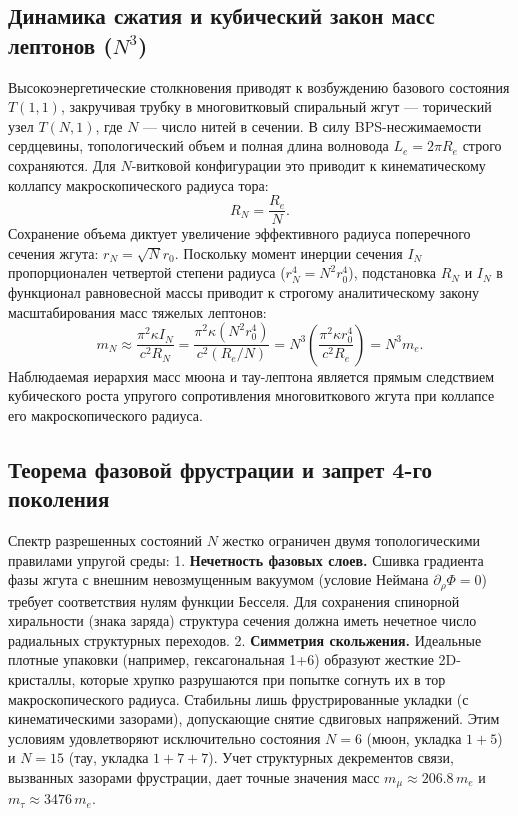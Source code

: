 \documentclass[12pt,a4paper]{article}
\begin{document}
\subsection{Динамика сжатия и кубический закон масс лептонов ($N^3$)}
Высокоэнергетические столкновения приводят к возбуждению базового состояния $T(1,1)$, закручивая трубку в многовитковый спиральный жгут — торический узел $T(N,1)$, где $N$ — число нитей в сечении.
В силу BPS-несжимаемости сердцевины, топологический объем и полная длина волновода $L_e = 2\pi R_e$ строго сохраняются. Для $N$-витковой конфигурации это приводит к кинематическому коллапсу макроскопического радиуса тора:
\begin{equation}
	R_N = \frac{R_e}{N}.
\end{equation}
Сохранение объема диктует увеличение эффективного радиуса поперечного сечения жгута: $r_N = \sqrt{N} r_0$. Поскольку момент инерции сечения $I_N$ пропорционален четвертой степени радиуса ($r_N^4 = N^2 r_0^4$), подстановка $R_N$ и $I_N$ в функционал равновесной массы приводит к строгому аналитическому закону масштабирования масс тяжелых лептонов:
\begin{equation}
	m_N \approx \frac{\pi^2 \kappa I_N}{c^2 R_N} = \frac{\pi^2 \kappa (N^2 r_0^4)}{c^2 (R_e / N)} = N^3 \left( \frac{\pi^2 \kappa r_0^4}{c^2 R_e} \right) = N^3 m_e.
	\label{eq:cubic_mass_law}
\end{equation}
Наблюдаемая иерархия масс мюона и тау-лептона является прямым следствием кубического роста упругого сопротивления многовиткового жгута при коллапсе его макроскопического радиуса.

\subsection{Теорема фазовой фрустрации и запрет 4-го поколения}
Спектр разрешенных состояний $N$ жестко ограничен двумя топологическими правилами упругой среды:
1. \textbf{Нечетность фазовых слоев.} Сшивка градиента фазы жгута с внешним невозмущенным вакуумом (условие Неймана $\partial_\rho \Phi = 0$) требует соответствия нулям функции Бесселя. Для сохранения спинорной хиральности (знака заряда) структура сечения должна иметь нечетное число радиальных структурных переходов.
2. \textbf{Симметрия скольжения.} Идеальные плотные упаковки (например, гексагональная 1+6) образуют жесткие 2D-кристаллы, которые хрупко разрушаются при попытке согнуть их в тор макроскопического радиуса. Стабильны лишь фрустрированные укладки (с кинематическими зазорами), допускающие снятие сдвиговых напряжений.
Этим условиям удовлетворяют исключительно состояния $N=6$ (мюон, укладка $1+5$) и $N=15$ (тау, укладка $1+7+7$). Учет структурных декрементов связи, вызванных зазорами фрустрации, дает точные значения масс $m_\mu \approx 206.8 \, m_e$ и $m_\tau \approx 3476 \, m_e$.
\end{document}
